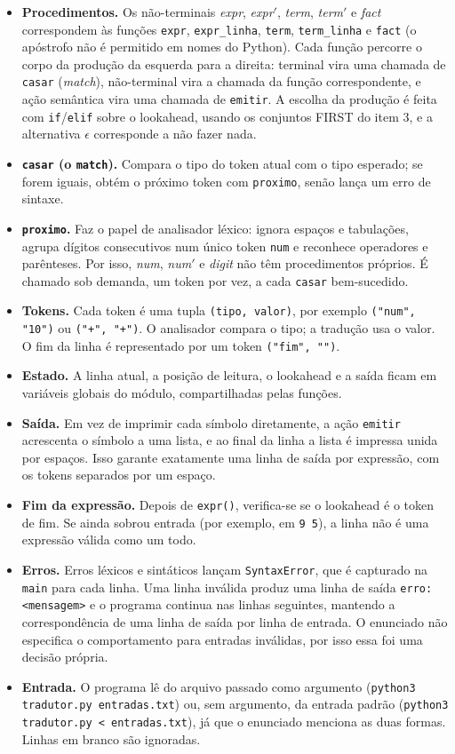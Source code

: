 \documentclass[11pt,a4paper]{article}
\newcommand{\nt}[1]{\textit{#1}}                 %
\newcommand{\vazio}{\ensuremath{\epsilon}}
\newcommand{\linha}{\ensuremath{'}}
\begin{document}
	\begin{itemize}
		\item \textbf{Procedimentos.} Os não-terminais \nt{expr}, \nt{expr}\linha, \nt{term}, \nt{term}\linha{} e \nt{fact} correspondem às funções \texttt{expr}, \texttt{expr\_linha}, \texttt{term}, \texttt{term\_linha} e \texttt{fact} (o apóstrofo não é permitido em nomes do Python). Cada função percorre o corpo da produção da esquerda para a direita: terminal vira uma chamada de \texttt{casar} (\textit{match}), não-terminal vira a chamada da função correspondente, e ação semântica vira uma chamada de \texttt{emitir}. A escolha da produção é feita com \texttt{if}/\texttt{elif} sobre o lookahead, usando os conjuntos FIRST do item 3, e a alternativa \vazio{} corresponde a não fazer nada.
		\item \textbf{\texttt{casar} (o \texttt{match}).} Compara o tipo do token atual com o tipo esperado; se forem iguais, obtém o próximo token com \texttt{proximo}, senão lança um erro de sintaxe.
		\item \textbf{\texttt{proximo}.} Faz o papel de analisador léxico: ignora espaços e tabulações, agrupa dígitos consecutivos num único token \texttt{num} e reconhece operadores e parênteses. Por isso, \nt{num}, \nt{num}\linha{} e \nt{digit} não têm procedimentos próprios. É chamado sob demanda, um token por vez, a cada \texttt{casar} bem-sucedido.
		\item \textbf{Tokens.} Cada token é uma tupla \texttt{(tipo, valor)}, por exemplo \texttt{("num", "10")} ou \texttt{("+", "+")}. O analisador compara o tipo; a tradução usa o valor. O fim da linha é representado por um token \texttt{("fim", "")}.
		\item \textbf{Estado.} A linha atual, a posição de leitura, o lookahead e a saída ficam em variáveis globais do módulo, compartilhadas pelas funções.
		\item \textbf{Saída.} Em vez de imprimir cada símbolo diretamente, a ação \texttt{emitir} acrescenta o símbolo a uma lista, e ao final da linha a lista é impressa unida por espaços. Isso garante exatamente uma linha de saída por expressão, com os tokens separados por um espaço.
		\item \textbf{Fim da expressão.} Depois de \texttt{expr()}, verifica-se se o lookahead é o token de fim. Se ainda sobrou entrada (por exemplo, em \texttt{9 5}), a linha não é uma expressão válida como um todo.
		\item \textbf{Erros.} Erros léxicos e sintáticos lançam \texttt{SyntaxError}, que é capturado na \texttt{main} para cada linha. Uma linha inválida produz uma linha de saída \texttt{erro: <mensagem>} e o programa continua nas linhas seguintes, mantendo a correspondência de uma linha de saída por linha de entrada. O enunciado não especifica o comportamento para entradas inválidas, por isso essa foi uma decisão própria.
		\item \textbf{Entrada.} O programa lê do arquivo passado como argumento (\texttt{python3 tradutor.py entradas.txt}) ou, sem argumento, da entrada padrão (\texttt{python3 tradutor.py < entradas.txt}), já que o enunciado menciona as duas formas. Linhas em branco são ignoradas.
	\end{itemize}
	
\end{document}
